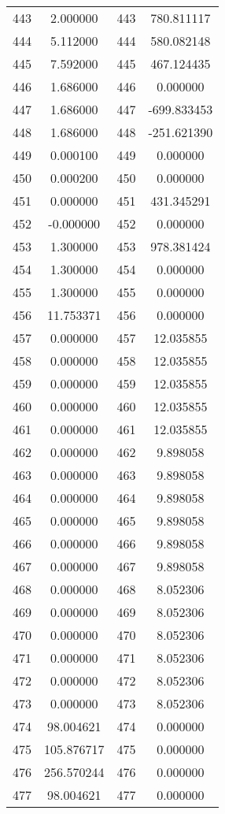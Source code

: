 \documentclass[12pt]{article}
\begin{document}
\begin{longtable}{@{}cccc@{}}
443 & 2.000000 & 443 & 780.811117 \\
444 & 5.112000 & 444 & 580.082148 \\
445 & 7.592000 & 445 & 467.124435 \\
446 & 1.686000 & 446 & 0.000000 \\
447 & 1.686000 & 447 & -699.833453 \\
448 & 1.686000 & 448 & -251.621390 \\
449 & 0.000100 & 449 & 0.000000 \\
450 & 0.000200 & 450 & 0.000000 \\
451 & 0.000000 & 451 & 431.345291 \\
452 & -0.000000 & 452 & 0.000000 \\
453 & 1.300000 & 453 & 978.381424 \\
454 & 1.300000 & 454 & 0.000000 \\
455 & 1.300000 & 455 & 0.000000 \\
456 & 11.753371 & 456 & 0.000000 \\
457 & 0.000000 & 457 & 12.035855 \\
458 & 0.000000 & 458 & 12.035855 \\
459 & 0.000000 & 459 & 12.035855 \\
460 & 0.000000 & 460 & 12.035855 \\
461 & 0.000000 & 461 & 12.035855 \\
462 & 0.000000 & 462 & 9.898058 \\
463 & 0.000000 & 463 & 9.898058 \\
464 & 0.000000 & 464 & 9.898058 \\
465 & 0.000000 & 465 & 9.898058 \\
466 & 0.000000 & 466 & 9.898058 \\
467 & 0.000000 & 467 & 9.898058 \\
468 & 0.000000 & 468 & 8.052306 \\
469 & 0.000000 & 469 & 8.052306 \\
470 & 0.000000 & 470 & 8.052306 \\
471 & 0.000000 & 471 & 8.052306 \\
472 & 0.000000 & 472 & 8.052306 \\
473 & 0.000000 & 473 & 8.052306 \\
474 & 98.004621 & 474 & 0.000000 \\
475 & 105.876717 & 475 & 0.000000 \\
476 & 256.570244 & 476 & 0.000000 \\
477 & 98.004621 & 477 & 0.000000 \\

\end{longtable}
\end{document}
